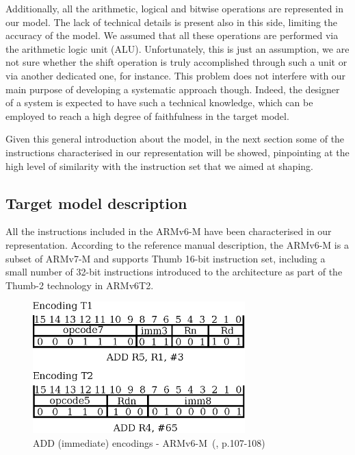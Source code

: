 \documentclass[conference]{IEEEtran}
\begin{document}
Additionally, all the arithmetic, logical and bitwise operations are represented in our
model. The lack of technical details is present also in this side, limiting the accuracy of
the model. We assumed that all these operations are
performed via the arithmetic logic unit (ALU). Unfortunately, this is just an
assumption, we are not sure whether the shift operation is truly accomplished
through such a unit or via another dedicated one, for instance.
This problem does not interfere with our main purpose of
developing a systematic approach though. Indeed, the designer of a system is expected to have
such a technical knowledge, which can be employed to reach a high degree of faithfulness in
the target model.

Given this general introduction about the model, in the next section some of the instructions
characterised in our representation will be showed, pinpointing at the high level of
similarity with the instruction set that we aimed at shaping.

\subsection{Target model description}
\label{sec:mod}
All the instructions included in the ARMv6-M have been characterised in our representation.
According to the reference manual description, the ARMv6-M is a subset of ARMv7-M and
supports Thumb 16-bit instruction set, including a small number of 32-bit instructions
introduced to the architecture as part of the Thumb-2 technology in ARMv6T2. 

\begin{figure}[ht!]
\begin{center}
	\includegraphics[width=8.2cm]{IMG/encodings_ex.eps}
	\caption{ADD (immediate) encodings - ARMv6-M~(\cite{armManual}, p.107-108)}
	\label{fig:ADDEnc}
\end{center}
\end{figure}
\end{document}

